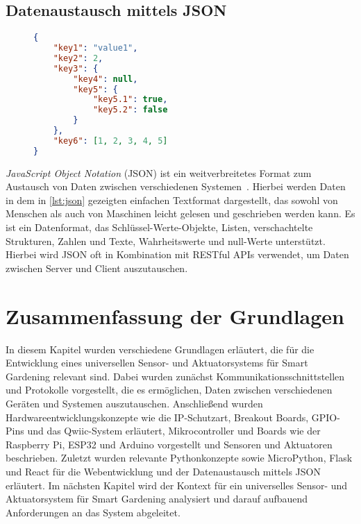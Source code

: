 \subsection*{Datenaustausch mittels JSON}

\begin{figure}[!htb]
\begin{lstlisting}[language=json, caption={
	Beispiel für den Aufbau einer JSON Datei.
	},
	label={lst:json}
]
{
	"key1": "value1",
	"key2": 2,
	"key3": {
		"key4": null,
		"key5": {
			"key5.1": true,
			"key5.2": false
		}
	},
	"key6": [1, 2, 3, 4, 5]
}
\end{lstlisting}
\end{figure}

\emph{JavaScript Object Notation} (JSON) ist ein weitverbreitetes Format zum Austausch von Daten zwischen verschiedenen Systemen~\cite{JSON}.
Hierbei werden Daten in dem in \cref{lst:json} gezeigten einfachen Textformat dargestellt, das sowohl von Menschen als auch von Maschinen leicht gelesen und geschrieben werden kann.
Es ist ein Datenformat, das Schlüssel-Werte-Objekte, Listen, verschachtelte Strukturen, Zahlen und Texte, Wahrheitswerte und null-Werte unterstützt.
Hierbei wird JSON oft in Kombination mit RESTful APIs verwendet, um Daten zwischen Server und Client auszutauschen.



\section{Zusammenfassung der Grundlagen}
In diesem Kapitel wurden verschiedene Grundlagen erläutert, die für die Entwicklung eines universellen Sensor- und Aktuatorsystems für Smart Gardening relevant sind.
Dabei wurden zunächst Kommunikationsschnittstellen und Protokolle vorgestellt, die es ermöglichen, Daten zwischen verschiedenen Geräten und Systemen auszutauschen.
Anschließend wurden Hardwareentwicklungskonzepte wie die IP-Schutzart, Breakout Boards, GPIO-Pins und das Qwiic-System erläutert, Mikrocontroller und Boards wie der Raspberry Pi, ESP32 und Arduino vorgestellt und Sensoren und Aktuatoren beschrieben.
Zuletzt wurden relevante Pythonkonzepte sowie MicroPython, Flask und React für die Webentwicklung und der Datenaustausch mittels JSON erläutert.
Im nächsten Kapitel wird der Kontext für ein universelles Sensor- und Aktuatorsystem für Smart Gardening analysiert und darauf aufbauend Anforderungen an das System abgeleitet.